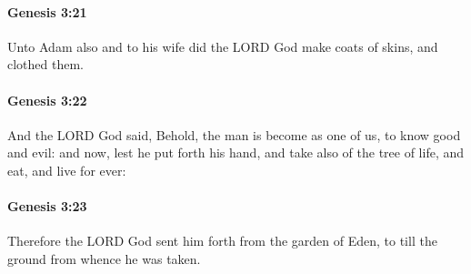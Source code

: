 		\paragraph{Genesis 3:21} %
			\label{GENESIS-3-21}

			Unto Adam also and to his wife did the LORD God make coats of skins, and clothed them.


		\paragraph{Genesis 3:22} %
			\label{GENESIS-3-22}

			And the LORD God said, Behold, the man is become as one of us, to know good and evil: and now, lest he put forth his hand, and take also of the tree of life, and eat, and live for ever:


		\paragraph{Genesis 3:23} %
			\label{GENESIS-3-23}

			Therefore the LORD God sent him forth from the garden of Eden, to till the ground from whence he was taken.


